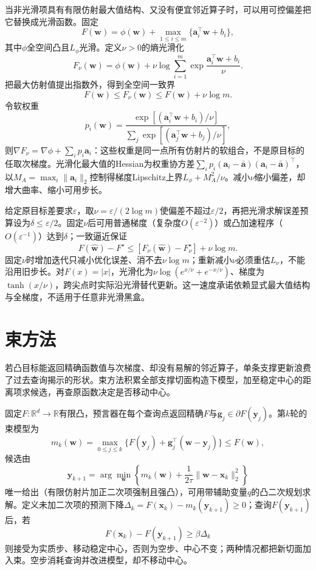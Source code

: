 当非光滑项具有有限仿射最大值结构、又没有便宜邻近算子时，可以用可控偏差把它替换成光滑函数。固定
\[
 F(\bm w)=\phi(\bm w)+\max_{1\leq i\leq m}\{\bm a_i^\top\bm w+b_i\},
\]
其中$\phi$全空间凸且$L_\phi$光滑。定义$\nu>0$的熵光滑化
\[
 F_\nu(\bm w)=\phi(\bm w)
 +\nu\log\sum_{i=1}^m
 \exp\frac{\bm a_i^\top\bm w+b_i}{\nu}.
\]
把最大仿射值提出指数外，得到全空间一致界
\begin{equation}
 F(\bm w)\leq F_\nu(\bm w)\leq F(\bm w)+\nu\log m.
 \label{eq:opt-smoothing-gap}
\end{equation}
令软权重
\[
 p_i(\bm w)=
 \frac{\exp[(\bm a_i^\top\bm w+b_i)/\nu]}
 {\sum_j\exp[(\bm a_j^\top\bm w+b_j)/\nu]},
\]
则$\nabla F_\nu=\nabla\phi+\sum_i p_i\bm a_i$：这些权重是同一点所有仿射片的软组合，不是原目标的任取次梯度。光滑化最大值的Hessian为权重协方差$\sum_i p_i(\bm a_i-\bar{\bm a})(\bm a_i-\bar{\bm a})^\top$，以$M_A=\max_i\|\bm a_i\|_2$控制得梯度Lipschitz上界$L_\phi+M_A^2/\nu$。减小$\nu$缩小偏差，却增大曲率、缩小可用步长。

给定原目标差要求$\varepsilon$，取$\nu=\varepsilon/(2\log m)$使偏差不超过$\varepsilon/2$，再把光滑求解误差预算设为$\delta\leq\varepsilon/2$。固定$\nu$后可用普通梯度（复杂度$O(\varepsilon^{-2})$）或凸加速程序（$O(\varepsilon^{-1})$）达到$\delta$；一致逼近保证
\[
 F(\widehat{\bm w})-F^\star
 \leq[F_\nu(\widehat{\bm w})-F_\nu^\star]+\nu\log m.
\]
固定$\nu$时增加迭代只减小优化误差、消不去$\nu\log m$；重新减小$\nu$必须重估$L_\nu$，不能沿用旧步长。对$F(x)=|x|$，光滑化为$\nu\log(e^{x/\nu}+e^{-x/\nu})$、梯度为$\tanh(x/\nu)$，跨尖点时实际沿光滑替代更新。这一速度承诺依赖显式最大值结构与全梯度，不适用于任意非光滑黑盒。

\section{束方法}

若凸目标能返回精确函数值与次梯度、却没有易解的邻近算子，单条支撑更新浪费了过去查询揭示的形状。束方法积累全部支撑切面构造下模型，加至稳定中心的距离项求候选，再查原函数决定是否移动中心。

固定$F:\mathbb R^d\to\mathbb R$有限凸，预言器在每个查询点返回精确$F$与$\bm g_j\in\partial F(\bm y_j)$。第$k$轮的束模型为
\[
 m_k(\bm w)=\max_{0\leq j\leq k}
 \{F(\bm y_j)+\bm g_j^\top(\bm w-\bm y_j)\}\leq F(\bm w),
\]
候选由
\[
 \bm y_{k+1}=\arg\min_{\bm w}\left\{
 m_k(\bm w)+\frac{1}{2\tau}\|\bm w-\bm x_k\|_2^2
 \right\}
\]
唯一给出（有限仿射片加正二次项强制且强凸），可用带辅助变量$q$的凸二次规划求解。定义未加二次项的预测下降$\Delta_k=F(\bm x_k)-m_k(\bm y_{k+1})\geq0$；查询$F(\bm y_{k+1})$后，若
\[
 F(\bm x_k)-F(\bm y_{k+1})\geq\beta\Delta_k
\]
则接受为实质步、移动稳定中心，否则为空步、中心不变；两种情况都把新切面加入束。空步消耗查询并改进模型，却不移动中心。

